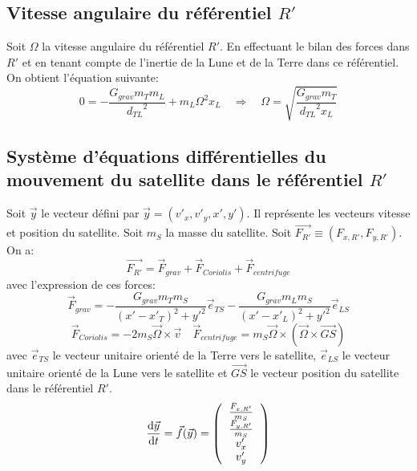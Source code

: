 \documentclass[a4paper,12pt,twoside]{article}
\begin{document}
\subsection{Vitesse angulaire du référentiel $R'$}

Soit $\Omega$ la vitesse angulaire du référentiel $R'$. En effectuant le bilan des forces dans $R'$ et en tenant compte de l'inertie de la Lune et de la Terre dans ce référentiel. On obtient l'équation suivante:
\begin{equation}
0 = -\displaystyle\frac{G_{grav}m_Tm_L}{{d_{TL}}^2} + m_L\Omega^2x_L
\quad\Rightarrow\quad
\Omega = \sqrt{\displaystyle\frac{G_{grav}m_T}{{d_{TL}}^2x_L}}
\end{equation}

\subsection{Système d’équations différentielles du mouvement du satellite dans le référentiel $R'$}

Soit $\vec{y}$ le vecteur défini par $\vec{y} = (v'_x,v'_y,x',y')$. Il représente les vecteurs vitesse et position du satellite. Soit $m_S$ la masse du satellite. Soit $\vec{F_{R'}} \equiv (F_{x,R'},F_{y,R'})$. On a:
\begin{equation}
\vec{F_{R'}} = \vec{F}_{grav}+\vec{F}_{Coriolis}+\vec{F}_{centrifuge}
\end{equation}
avec l'expression de ces forces:
\begin{equation}
\vec{F}_{grav} = -\displaystyle\frac{G_{grav}m_Tm_S}{(x'-x'_T)^2+{y'}^2}\vec{e}_{TS} -\displaystyle\frac{G_{grav}m_Lm_S}{(x'-x'_L)^2+{y'}^2}\vec{e}_{LS} 
\end{equation}
\begin{equation}
\vec{F}_{Coriolis} = -2m_S\vec{\Omega}\times\vec{v} \quad \vec{F}_{centrifuge}=m_S\vec{\Omega}\times(\vec{\Omega}\times\vec{GS})
\end{equation}
avec $\vec{e}_{TS}$ le vecteur unitaire orienté de la Terre vers le satellite, $\vec{e}_{LS}$ le vecteur unitaire orienté de la Lune vers le satellite et $\vec{GS}$ le vecteur position du satellite dans le référentiel $R'$.
\begin{equation}
\displaystyle\frac{\text{d}\vec{y}}{\text{d}t} = \vec{f}(\vec{y}) = \left(
\begin{tabular}{c}
     $\frac{F_{x,R'}}{m_S}$ \\
     $\frac{F_{y,R'}}{m_S}$\\
     $v'_x$\\
     $v'_y$
\end{tabular}
\right)
\end{equation}
\end{document}
